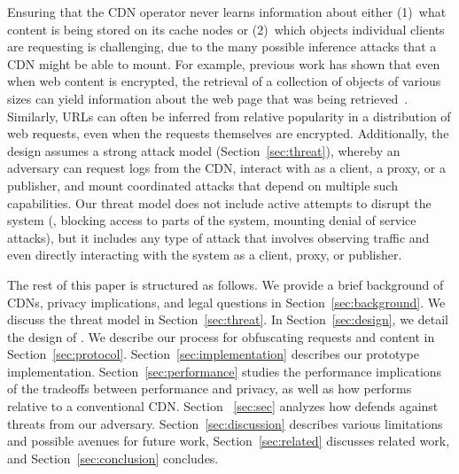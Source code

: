 Ensuring that the CDN operator never learns information about either (1)~what
content is being stored on its cache nodes or (2)~which objects individual
clients are requesting is challenging, due to the many possible inference
attacks that a CDN might be able to mount. For example, previous work has
shown that even when web content is encrypted, the retrieval of a collection
of objects of various sizes can yield information about the web page that was
being retrieved~\cite{panchenko2016website, cai2012touching}. Similarly, URLs
can often be inferred from relative popularity in a distribution of web
requests, even when the requests themselves are encrypted. Additionally, the
\system{} design assumes a strong attack model (Section~\ref{sec:threat}),
whereby an adversary can request logs from the CDN, interact with \system{} as
a client, a proxy, or a publisher, and mount coordinated attacks that depend on
multiple such capabilities. Our threat model does not include active attempts
to disrupt the system (\eg, blocking access to parts of the system, mounting
denial of service attacks), but it includes any type of attack
that involves observing traffic and even directly interacting with the system
as a client, proxy, or publisher.

The rest of this paper is structured as follows. We provide a brief background
of CDNs, privacy implications, and legal questions in
Section~\ref{sec:background}. We discuss the threat model in
Section~\ref{sec:threat}. In Section~\ref{sec:design}, we detail the design of
\system{}. We describe our process for obfuscating requests and content in
Section~\ref{sec:protocol}.  
Section~\ref{sec:implementation} describes our prototype implementation. Section~\ref{sec:performance}
studies the performance implications of the tradeoffs between performance and
privacy, as well as how \system{} performs relative to a conventional CDN. Section~
\ref{sec:sec} analyzes how \system{}
defends against threats from our adversary.
Section~\ref{sec:discussion} describes various limitations and possible
avenues for future work, Section~\ref{sec:related} discusses related work, and
Section~\ref{sec:conclusion} concludes.

